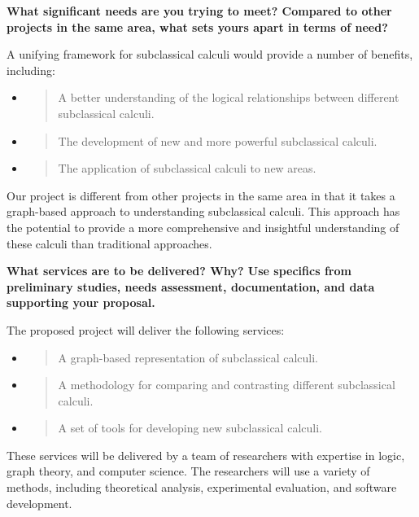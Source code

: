 \textbf{What significant needs are you trying to meet? Compared to other
projects in the same area, what sets yours apart in terms of need?}

A unifying framework for subclassical calculi would provide a number of
benefits, including:

\begin{itemize}
\item
  \begin{quote}
  A better understanding of the logical relationships between different
  subclassical calculi.
  \end{quote}
\item
  \begin{quote}
  The development of new and more powerful subclassical calculi.
  \end{quote}
\item
  \begin{quote}
  The application of subclassical calculi to new areas.
  \end{quote}
\end{itemize}

Our project is different from other projects in the same area in that it
takes a graph-based approach to understanding subclassical calculi. This
approach has the potential to provide a more comprehensive and
insightful understanding of these calculi than traditional approaches.

\textbf{What services are to be delivered? Why? Use specifics from
preliminary studies, needs assessment, documentation, and data
supporting your proposal.}

The proposed project will deliver the following services:

\begin{itemize}
\item
  \begin{quote}
  A graph-based representation of subclassical calculi.
  \end{quote}
\item
  \begin{quote}
  A methodology for comparing and contrasting different subclassical
  calculi.
  \end{quote}
\item
  \begin{quote}
  A set of tools for developing new subclassical calculi.
  \end{quote}
\end{itemize}

These services will be delivered by a team of researchers with expertise
in logic, graph theory, and computer science. The researchers will use a
variety of methods, including theoretical analysis, experimental
evaluation, and software development.


